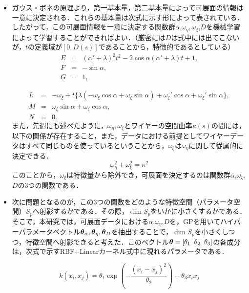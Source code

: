 \documentclass[11pt]{jsarticle}
\begin{document}
			\begin{itemize}
				\item ガウス・ボネの原理より，第一基本量，第二基本量によって可展面の情報は一意に決定される．これらの基本量は次式に示す形によって表されている．したがって，この可展面情報を一意に決定する関数群$ \alpha $,$ \omega_{\eta} , \omega_{\xi}$,$ D $を機械学習によって学習することができればよい．（厳密には$ D $は式中には出てこないが，$ t $の定義域が$ [0,D(s)] $であることから，特徴的であるとしている）
				\begin{eqnarray}
				E &=& (\alpha'+\lambda)^2 t^2 -2\cos \alpha(\alpha'+\lambda) t + 1,\\
				F &=& -\sin \alpha,\\
				G &=& 1,
				\end{eqnarray}
				
				\begin{eqnarray}
				L &=& -\omega_{\xi}+t\{\lambda(-\omega_{\xi}\cos \alpha + \omega_{\zeta}\sin \alpha)+\omega_{\zeta}'\cos \alpha + \omega_{\xi}'\sin \alpha \},  \\
				M &=& \omega_{\xi}\sin \alpha + \omega_{\zeta} \cos \alpha,  \\
				N &=& 0. 
				\end{eqnarray}
				また，先週にも述べたように，$  \omega_{\eta} , \omega_{\xi} $とワイヤーの空間曲率$ \kappa (s) $の間には，以下の関係が存在すること，また，データにおける前提としてワイヤーデータはすべて同じものを使っているということから，$ \omega_{\xi} $は$ \omega_{\eta} $に関して従属的に決定できる．
				\begin{equation}\label{eq:kappaeq}
					\omega_{\eta}^2 + \omega_{\xi}^2 = \kappa^2
				\end{equation}
				このことから，$ \omega_{\xi} $は特徴量から除外でき，可展面を決定するのは関数群$ \alpha $,$ \omega_{\eta} $,$ D $の3つの関数である．
				
				\item 次に問題となるのが，この3つの関数をどのような特徴空間（パラメータ空間）$ S_p $へ射影するかである．その際，$ \dim{S_p} $をいかに小さくするかである．そこで，本研究では，可展面データにおける$ \alpha $,$ \omega_{\eta} $,$ D $を，GPを用いてハイパーパラメータベクトル$ \boldsymbol{\theta}_{\alpha},\boldsymbol{\theta}_{\eta},\boldsymbol{\theta}_{D} $を抽出することで，$ \dim{S_p} $を小さくしつつ，特徴空間へ射影できると考えた．このベクトル$ \boldsymbol{\theta} = [\theta_1 \;\; \theta_2 \;\; \theta_3] $の各成分は，次式で示すRBF+Linearカーネル式中に現れるパラメータである．
				
				\begin{equation}\label{eq:RBFLinear}
					k(x_i,x_j) = \theta_1 \exp \left( -\frac{(x_i-x_j)^2}{\theta_2} \right) + \theta_3 x_i x_j
				\end{equation}
				

\end{itemize}
\end{document}
